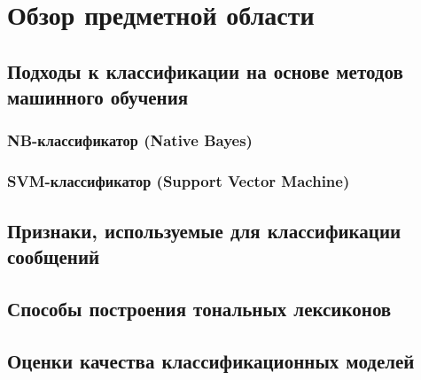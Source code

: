 \newpage
\section{Обзор предметной области}
    \subsection{Подходы к классификации на основе методов машинного обучения}
        \subsubsection{NB-классификатор (Native Bayes)}
        \subsubsection{SVM-классификатор (Support Vector Machine)}
    \subsection{Признаки, используемые для классификации сообщений}
    \subsection{Способы построения тональных лексиконов}

    \subsection{Оценки качества классификационных моделей}

